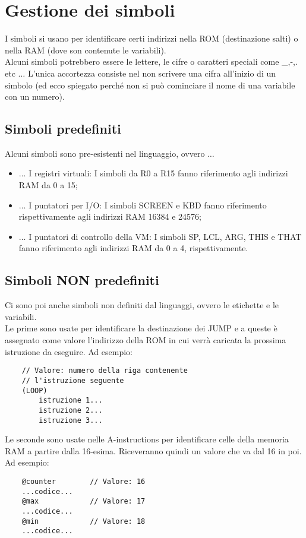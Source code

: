 \documentclass[12pt]{article}
\begin{document}
\section{Gestione dei simboli}
\label{sec:gestione_simboli}
I simboli si usano per identificare certi indirizzi nella ROM (destinazione salti) o nella RAM (dove son contenute le variabili).
\\
Alcuni simboli potrebbero essere le lettere, le cifre o caratteri speciali come \_,-,. etc $\dots$
L'unica accortezza consiste nel non scrivere una cifra all'inizio di un simbolo (ed ecco spiegato perché non si può cominciare il nome di una variabile con un numero).

\subsection{Simboli predefiniti}
\label{ssec:simboli_predef}
Alcuni simboli sono pre-esistenti nel linguaggio, ovvero $\dots$
\begin{itemize}
    \item $\dots$ I registri virtuali: I simboli da R0 a R15 fanno riferimento agli indirizzi RAM da 0 a 15;
    \item $\dots$ I puntatori per I/O: I simboli SCREEN e KBD fanno riferimento rispettivamente agli indirizzi RAM 16384 e 24576;
    \item $\dots$ I puntatori di controllo della VM: I simboli SP, LCL, ARG, THIS e THAT fanno riferimento agli indirizzi RAM da 0 a 4, rispettivamente.
\end{itemize}

\subsection{Simboli NON predefiniti}
\label{ssec:simboli_non_predef}
Ci sono poi anche simboli non definiti dal linguaggi, ovvero le etichette e le variabili.
\\
Le prime sono usate per identificare la destinazione dei JUMP e a queste è assegnato come valore l'indirizzo della ROM in cui verrà caricata la prossima istruzione da eseguire. Ad esempio:
\begin{lstlisting}
    // Valore: numero della riga contenente
    // l'istruzione seguente
    (LOOP)
        istruzione 1...
        istruzione 2...
        istruzione 3...
\end{lstlisting}
Le seconde sono usate nelle A-instructions per identificare celle della memoria RAM a partire dalla 16-esima. Riceveranno quindi un valore che va dal 16 in poi. Ad esempio:
\begin{lstlisting}
    @counter        // Valore: 16
    ...codice...
    @max            // Valore: 17
    ...codice...
    @min            // Valore: 18
    ...codice...
\end{lstlisting}
\end{document}
